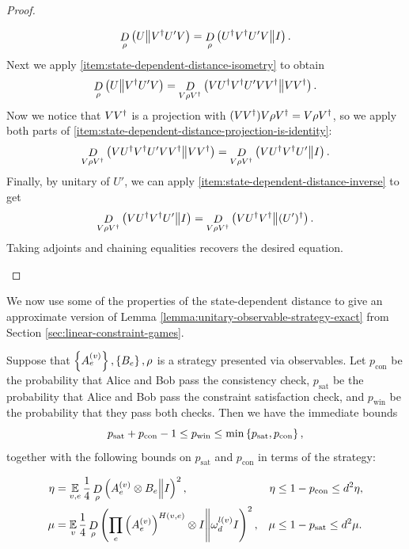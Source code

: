 \begin{proof}
\begin{enumerate}[(a)]
	\begin{equation}
		\mathop{D}\limits_{\rho}\left(U\middle\| V^\dagger U' V\right)
		= \mathop{D}\limits_{\rho}\left(U^\dagger V^\dagger U' V\middle\| I\right).
	\end{equation}
	Next we apply \eqref{item:state-dependent-distance-isometry} to obtain
	\begin{equation}
		\mathop{D}\limits_{\rho}\left(U\middle\| V^\dagger U' V\right)
		= \mathop{D}\limits_{V\rho V^\dagger}\left(VU^\dagger V^\dagger U' V V^\dagger\middle\| VV^\dagger\right).
	\end{equation}
	Now we notice that $VV^\dagger$ is a projection with $(VV^\dagger) V\rho V^\dagger = V\rho V^\dagger$, so we apply both parts of \eqref{item:state-dependent-distance-projection-is-identity}:
	\begin{equation}
		\mathop{D}\limits_{V\rho V^\dagger}\left(VU^\dagger V^\dagger U' V V^\dagger\middle\| VV^\dagger\right)
		=\mathop{D}\limits_{V\rho V^\dagger}\left(VU^\dagger V^\dagger U'\middle\| I\right).
	\end{equation}
	Finally, by unitary of $U'$, we can apply \eqref{item:state-dependent-distance-inverse} to get
	\begin{equation}
		\mathop{D}\limits_{V\rho V^\dagger}\left(VU^\dagger V^\dagger U'\middle\| I\right)
		=\mathop{D}\limits_{V\rho V^\dagger}\left(VU^\dagger V^\dagger\middle\| (U')^\dagger\right).
	\end{equation}
	Taking adjoints and chaining equalities recovers the desired equation.
\end{enumerate}
\end{proof}

We now use some of the properties of the state-dependent distance to give an approximate version of Lemma \ref{lemma:unitary-observable-strategy-exact} from Section \ref{sec:linear-constraint-games}.

\begin{lemma}\label{lemma:unitary-observable-strategy}
	Suppose that $\left\{A_e^{(v)}\right\}, \left\{B_e\right\}, \rho$ is a strategy presented via observables. Let $p_\text{con}$ be the probability that Alice and Bob pass the consistency check, $p_\text{sat}$ be the probability that Alice and Bob pass the constraint satisfaction check, and $p_\text{win}$ be the probability that they pass both checks. Then we have the immediate bounds
	\begin{equation}
		p_\text{sat} + p_\text{con} - 1 \leq p_\text{win} \leq \min\left\{p_\text{sat}, p_\text{con}\right\},
	\end{equation}
	together with the following bounds on $p_\text{sat}$ and $p_\text{con}$ in terms of the strategy:
	
	\begin{align}
		\label{eq:approximate-win-criterion-con}
		\eta &= \operatorname*{\mathbb E}\limits_{v,e} \frac14\mathop{D}\limits_{\rho}\left(A_e^{(v)}\otimes B_e\middle\| I\right)^2,
		&\eta &\leq 1-p_\text{con} \leq d^2\eta,
		\\ \label{eq:approximate-win-criterion-sat}
		\mu &= 
		\operatorname*{\mathbb E}\limits_{v} \frac14
		\mathop{D}\limits_{\rho}\left(\prod_{e}\left(A_e^{(v)}\right)^{H(v,e)}\otimes I\middle\| \omega_d^{l(v)}I\right)^2,
		&\mu &\leq 1-p_\text{sat} \leq d^2\mu.
	\end{align}
\end{lemma}

